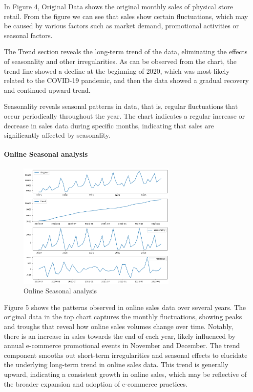 \documentclass{article}
\begin{document}
In Figure 4, Original Data shows the original monthly sales of physical store retail. From the figure we can see that sales show certain fluctuations, which may be caused by various factors such as market demand, promotional activities or seasonal factors.

The Trend section reveals the long-term trend of the data, eliminating the effects of seasonality and other irregularities. As can be observed from the chart, the trend line showed a decline at the beginning of 2020, which was most likely related to the COVID-19 pandemic, and then the data showed a gradual recovery and continued upward trend.

Seasonality reveals seasonal patterns in data, that is, regular fluctuations that occur periodically throughout the year. The chart indicates a regular increase or decrease in sales data during specific months, indicating that sales are significantly affected by seasonality.

\paragraph{Online Seasonal analysis}
\begin{figure}[h]
  \centering
  \includegraphics[width=0.7\textwidth]{Seasonal_analysis_online.png}
  \caption{Online Seasonal analysis}
  \label{fig:yourlabel}
\end{figure}

Figure 5 shows the patterns observed in online sales data over several years. The original data in the top chart captures the monthly fluctuations, showing peaks and troughs that reveal how online sales volumes change over time. Notably, there is an increase in sales towards the end of each year, likely influenced by annual e-commerce promotional events in November and December.
The trend component smooths out short-term irregularities and seasonal effects to elucidate the underlying long-term trend in online sales data. This trend is generally upward, indicating a consistent growth in online sales, which may be reflective of the broader expansion and adoption of e-commerce practices.
\end{document}
